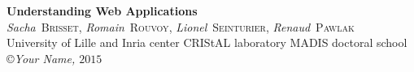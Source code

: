 \begin{titlepage}
\begin{center}

{\LARGE {\bf 
Understanding Web Applications
}}
\\[3cm]
\emph{Sacha}~\textsc{Brisset},
\emph{Romain}~\textsc{Rouvoy},
\emph{Lionel}~\textsc{Seinturier},
\emph{Renaud}~\textsc{Pawlak}
\\[3cm]
{\large University of Lille and Inria center
CRIStAL laboratory
MADIS doctoral school}
\\[5cm]
\copyright \textit{Your Name, $ 2015 $}

\end{center}
\end{titlepage}

